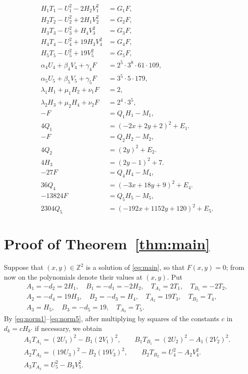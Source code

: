 \documentclass[11pt]{article}
\newcommand{\Z}{\mathbb{Z}}
\begin{document}
\begin{align}
H_{1}T_{1}-U_{1}^2-2H_{2}V_{1}^2&=G_{1}F,\label{eq:norm1}\\
H_{2}T_{2}-U_{2}^2+2H_{1}V_{2}^2&=G_{2}F,\label{eq:norm2}\\
H_{3}T_{3}-U_{3}^2+H_{4}V_{3}^2&=G_{3}F,\label{eq:norm3}\\
H_{4}T_{4}-U_{4}^2+19H_{3}V_{4}^2&=G_{4}F,\label{eq:norm4}\\
H_{5}T_{5}-U_{5}^2+19V_{5}^2&=G_{5}F,\label{eq:norm5}\\
\alpha_{4}U_{4}+\beta_{4}V_{4}+\gamma_{4}F&=2^{5}\cdot 3^{8}\cdot 61\cdot 109,\label{eq:bez4}\\
\alpha_{5}U_{5}+\beta_{5}V_{5}+\gamma_{5}F&=3^{5}\cdot 5\cdot 179,\label{eq:bez5}\\
\lambda_{1}H_{1}+\mu_{1}H_{2}+\nu_{1}F&=2,\label{eq:cross1}\\
\lambda_{2}H_{3}+\mu_{2}H_{4}+\nu_{2}F&=2^{4}\cdot 3^{5},\label{eq:cross2}\\
-F&=Q_{1}H_{1}-M_{1},\label{eq:sign1}\\
4Q_{1}&=(-2x+2y+2)^2+E_{1}.\label{eq:sign1b}\\
-F&=Q_{2}H_{2}-M_{2},\label{eq:sign2}\\
4Q_{2}&=(2y)^2+E_{2}.\label{eq:sign2b}\\
4H_{3}&=(2y-1)^2+7.\label{eq:sign3}\\
-27F&=Q_{4}H_{4}-M_{4},\label{eq:sign4}\\
36Q_{4}&=(-3x+18y+9)^2+E_{4}.\label{eq:sign4b}\\
-13824F&=Q_{5}H_{5}-M_{5},\label{eq:sign5}\\
2304Q_{5}&=(-192x+1152y+120)^2+E_{5}.\label{eq:sign5b}
\end{align}

\section{Proof of Theorem~\ref{thm:main}}

Suppose that $(x,y)\in\Z^2$ is a solution of \eqref{eq:main}, so that $F(x,y)=0$; from now on the polynomials denote their values at $(x,y)$. Put
\begin{gather*}
A_{1}=-d_{2}=2H_{1},\quad B_{1}=-d_{1}=-2H_{2},\quad T_{A_{1}}=2T_{1},\quad T_{B_{1}}=-2T_{2},\\
A_{2}=-d_{4}=19H_{3},\quad B_{2}=-d_{3}=H_{4},\quad T_{A_{2}}=19T_{3},\quad T_{B_{2}}=T_{4},\\
A_{3}=H_{5},\quad B_{3}=-d_{5}=19,\quad T_{A_{3}}=T_{5}.
\end{gather*}
By \eqref{eq:norm1}--\eqref{eq:norm5}, after multiplying by squares of the constants $c$ in $d_k=cH_{k'}$ if necessary, we obtain
\begin{align}
A_{1}T_{A_{1}}=(2U_{1})^2-B_{1}(2V_{1})^2,\qquad B_{1}T_{B_{1}}=(2U_{2})^2-A_{1}(2V_{2})^2.\label{eq:AB1}\\
A_{2}T_{A_{2}}=(19U_{3})^2-B_{2}(19V_{3})^2,\qquad B_{2}T_{B_{2}}=U_{4}^2-A_{2}V_{4}^2.\label{eq:AB2}\\
A_{3}T_{A_{3}}=U_{5}^2-B_{3} V_{5}^2.\label{eq:AB3}
\end{align}
\end{document}
